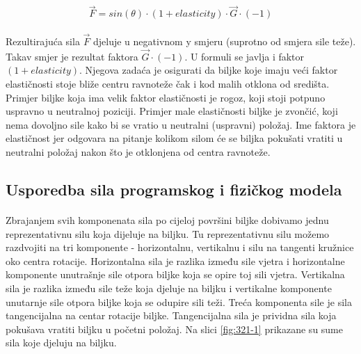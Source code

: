 \documentclass[times, utf8, diplomski]{fer}
\begin{document}
\begin{equation}
\vec{F} = sin(\theta) \cdot (1 + elasticity) \cdot \vec{G} \cdot (-1)
\label{eq:32-2}
\end{equation}

\paragraph{}
Rezultirajuća sila $\vec{F}$ djeluje u negativnom y smjeru (suprotno od smjera sile teže).
Takav smjer je rezultat faktora $\vec{G} \cdot (-1)$. U formuli se javlja i faktor $(1 + 
elasticity)$. Njegova zadaća je osigurati da biljke koje imaju veći faktor elastičnosti 
stoje bliže centru ravnoteže čak i kod malih otklona od središta. Primjer biljke koja ima 
velik faktor elastičnosti je rogoz, koji stoji potpuno uspravno u neutralnoj poziciji. 
Primjer male elastičnosti biljke je zvončić, koji nema dovoljno sile kako bi se vratio u 
neutralni (uspravni) položaj. Ime faktora je elastičnost jer odgovara na pitanje kolikom 
silom će se biljka pokušati vratiti u neutralni položaj nakon što je otklonjena od centra 
ravnoteže.

\subsection{Usporedba sila programskog i fizičkog modela}
\paragraph{}
Zbrajanjem svih komponenata sila po cijeloj površini biljke dobivamo jednu 
reprezentativnu silu koja dijeluje na biljku. Tu reprezentativnu silu možemo razdvojiti na 
tri komponente - horizontalnu, vertikalnu i silu na tangenti kružnice oko centra rotacije. 
Horizontalna sila je razlika između sile vjetra i horizontalne komponente unutrašnje sile 
otpora biljke koja se opire toj sili vjetra. Vertikalna sila je razlika između sile teže 
koja djeluje na biljku i vertikalne komponente unutarnje sile otpora biljke koja se odupire 
sili teži. Treća komponenta sile je sila tangencijalna na centar rotacije biljke. 
Tangencijalna sila je prividna sila koja pokušava vratiti biljku u početni položaj. Na slici 
\ref{fig:321-1} prikazane su sume sila koje djeluju na biljku.
\end{document}
